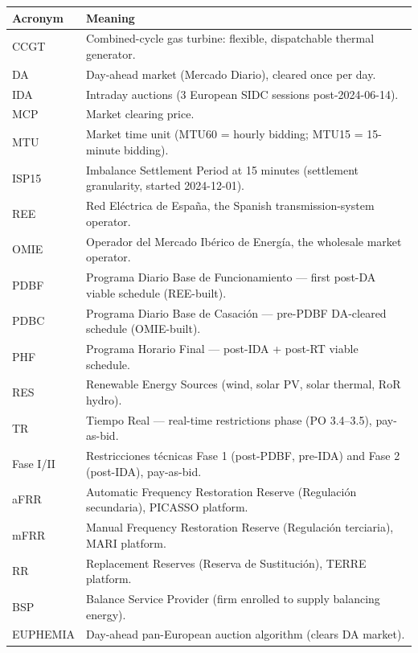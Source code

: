 \documentclass[11pt,a4paper]{article}
\begin{document}
\bigskip
\noindent
\renewcommand{\arraystretch}{1.15}
\begin{tabular}{@{}p{2.0cm} p{13.5cm}@{}}
\toprule
\textbf{Acronym} & \textbf{Meaning} \\
\midrule
CCGT & Combined-cycle gas turbine: flexible, dispatchable thermal generator. \\
DA & Day-ahead market (Mercado Diario), cleared once per day. \\
IDA & Intraday auctions (3 European SIDC sessions post-2024-06-14). \\
MCP & Market clearing price. \\
MTU & Market time unit (MTU60 = hourly bidding; MTU15 = 15-minute bidding). \\
ISP15 & Imbalance Settlement Period at 15 minutes (settlement granularity, started 2024-12-01). \\
REE & Red Eléctrica de España, the Spanish transmission-system operator. \\
OMIE & Operador del Mercado Ibérico de Energía, the wholesale market operator. \\
PDBF & Programa Diario Base de Funcionamiento — first post-DA viable schedule (REE-built). \\
PDBC & Programa Diario Base de Casación — pre-PDBF DA-cleared schedule (OMIE-built). \\
PHF & Programa Horario Final — post-IDA + post-RT viable schedule. \\
RES & Renewable Energy Sources (wind, solar PV, solar thermal, RoR hydro). \\
TR & Tiempo Real — real-time restrictions phase (PO 3.4--3.5), pay-as-bid. \\
Fase I/II & Restricciones técnicas Fase 1 (post-PDBF, pre-IDA) and Fase 2 (post-IDA), pay-as-bid. \\
aFRR & Automatic Frequency Restoration Reserve (Regulación secundaria), PICASSO platform. \\
mFRR & Manual Frequency Restoration Reserve (Regulación terciaria), MARI platform. \\
RR & Replacement Reserves (Reserva de Sustitución), TERRE platform. \\
BSP & Balance Service Provider (firm enrolled to supply balancing energy). \\
EUPHEMIA & Day-ahead pan-European auction algorithm (clears DA market). \\
\bottomrule
\end{tabular}
\renewcommand{\arraystretch}{1.0}
\end{document}
